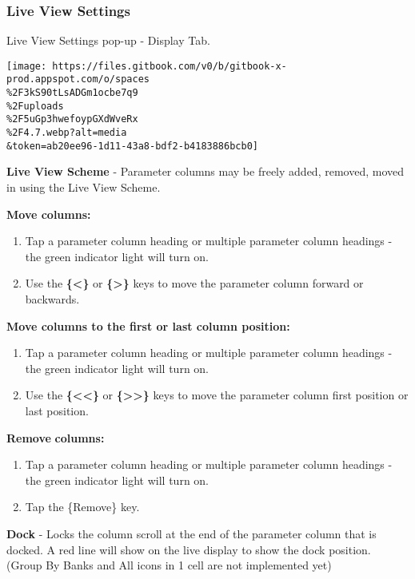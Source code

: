 \documentclass[
]{article}
\begin{document}
\hypertarget{live-view-settings}{%
\subsubsection{Live View Settings}\label{live-view-settings}}

Live View Settings pop-up - Display Tab.

\texttt{[image: https://files.gitbook.com/v0/b/gitbook-x-prod.appspot.com/o/spaces\\\%2F3kS90tLsADGm1ocbe7q9\\\%2Fuploads\\\%2F5uGp3hwefoypGXdWveRx\\\%2F4.7.webp?alt=media\\\&token=ab20ee96-1d11-43a8-bdf2-b4183886bcb0]}

\textbf{Live View Scheme} - Parameter columns may be freely added, removed, moved in using the Live View Scheme.

\textbf{Move columns:}

\begin{enumerate}
\def\labelenumi{\arabic{enumi}.}
\item
  Tap a parameter column heading or multiple parameter column headings - the green indicator light will turn on.
\item
  Use the \textbf{\{\textbar\textless\}} or \textbf{\{\textgreater\textbar\}} keys to move the parameter column forward or backwards.
\end{enumerate}

\textbf{Move columns to the first or last column position:}

\begin{enumerate}
\def\labelenumi{\arabic{enumi}.}
\item
  Tap a parameter column heading or multiple parameter column headings - the green indicator light will turn on.
\item
  Use the \textbf{\{\textbar\textless\textless\}} or \textbf{\{\textgreater\textgreater\textbar\}} keys to move the parameter column first position or last position.
\end{enumerate}

\textbf{Remove} \textbf{columns:}

\begin{enumerate}
\def\labelenumi{\arabic{enumi}.}
\item
  Tap a parameter column heading or multiple parameter column headings - the green indicator light will turn on.
\item
  Tap the \{Remove\} key.
\end{enumerate}

\textbf{Dock} - Locks the column scroll at the end of the parameter column that is docked. A red line will show on the live display to show the dock position. (Group By Banks and All icons in 1 cell are not implemented yet)
\end{document}
